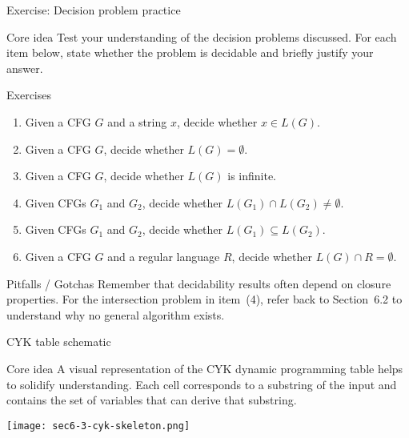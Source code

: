 \begin{frame}[t]{Exercise: Decision problem practice}
  \begin{tblock}{Core idea}
    Test your understanding of the decision problems discussed.  For
    each item below, state whether the problem is decidable and
    briefly justify your answer.
  \end{tblock}
  \begin{tblock}{Exercises}
    \begin{enumerate}
      \item Given a CFG $G$ and a string $x$, decide whether $x \in
        L(G)$.
      \item Given a CFG $G$, decide whether $L(G) = \emptyset$.
      \item Given a CFG $G$, decide whether $L(G)$ is infinite.
      \item Given CFGs $G_1$ and $G_2$, decide whether $L(G_1) \cap
        L(G_2) \ne \emptyset$.
      \item Given CFGs $G_1$ and $G_2$, decide whether $L(G_1)
        \subseteq L(G_2)$.
      \item Given a CFG $G$ and a regular language $R$, decide whether
        $L(G) \cap R = \emptyset$.
    \end{enumerate}
  \end{tblock}
  \begin{talert}{Pitfalls / Gotchas}
    Remember that decidability results often depend on closure
    properties.  For the intersection problem in item (4), refer back
    to Section 6.2 to understand why no general algorithm exists.
  \end{talert}
  \label{fr:6.3-15}
\end{frame}

\begin{frame}[t]{CYK table schematic}
  \begin{tblock}{Core idea}
    A visual representation of the CYK dynamic programming table helps
    to solidify understanding.  Each cell corresponds to a substring
    of the input and contains the set of variables that can derive
    that substring.
  \end{tblock}
  \begin{center}
    \texttt{[image: sec6-3-cyk-skeleton.png]} %
  \end{center}
  \label{fr:6.3-16}
\end{frame}


